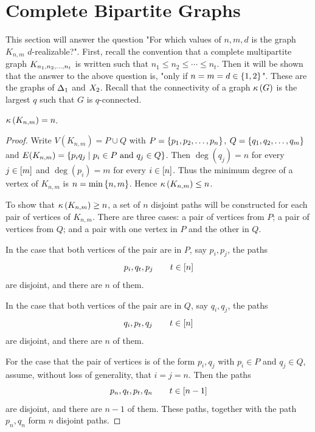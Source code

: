 \section{Complete Bipartite Graphs}

    This section will answer the question "For which values of \(n,m,d\) is the graph \(K_{n,m}\) \(d\)-realizable?".  First, recall the convention that a complete multipartite graph \(K_{n_1,n_2,\dotsc, n_t}\) is written such that \(n_1\le n_2\le\dotsb\le n_t\).  Then it will be shown that the answer to the above question is, "only if \(n=m=d\in\left\{1,2\right\}\)".  These are the graphs of \(\Delta_{1}\) and \(X_{2}\).  Recall that the connectivity of a graph \(\kappa\left(G\right)\) is the largest \(q\) such that \(G\) is \(q\)-connected.

    \begin{Lemma}\label{Lem:ConnCompBip}
        \(\kappa\left(K_{n,m}\right)=n\).
    \end{Lemma}
    \begin{proof}
        Write \(V(K_{n,m})=P\cup Q\) with \(P=\left\{p_1,p_2,\dotsc, p_n\right\}\), \(Q=\left\{q_1,q_2,\dotsc, q_m\right\}\) and \(E(K_{n,m})=\setb{p_iq_j}{p_i\in P\text{ and }q_j\in Q}\).  Then \(\deg(q_j)=n\) for every \(j\in\left[m\right]\) and \(\deg(p_i)=m\) for every \(i\in\left[n\right]\).  Thus the minimum degree of a vertex of \(K_{n,m}\) is \(n=\min\left\{n,m\right\}\).  Hence \(\kappa\left(K_{n,m}\right)\le n\).

        To show that \(\kappa\left(K_{n,m}\right)\ge n\), a set of \(n\) disjoint paths will be constructed for each pair of vertices of \(K_{n,m}\).  There are three cases: a pair of vertices from \(P\); a pair of vertices from \(Q\); and a pair with one vertex in \(P\) and the other in \(Q\).

        In the case that both vertices of the pair are in \(P\), say \(p_i,p_j\), the paths
            \[
                p_i,q_t,p_j\qquad t\in\left[n\right]
            \]
        are disjoint, and there are \(n\) of them.

        In the case that both vertices of the pair are in \(Q\), say \(q_i,q_j\), the paths
            \[
                q_i,p_t,q_j\qquad t\in\left[n\right]
            \]
        are disjoint, and there are \(n\) of them.

        For the case that the pair of vertices is of the form \(p_i,q_j\) with \(p_i\in P\) and \(q_j\in Q\), assume, without loss of generality, that \(i=j=n\).  Then the paths
            \[
                p_n,q_t,p_t,q_n\qquad t\in\left[n-1\right]
            \]
        are disjoint, and there are \(n-1\) of them.  These paths, together with the path \(p_n,q_n\) form \(n\) disjoint paths.
    \end{proof}

